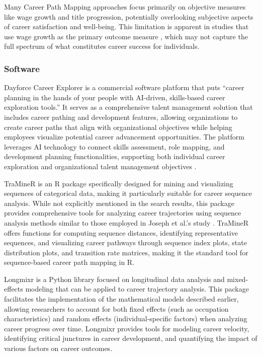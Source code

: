 \documentclass[../main.tex]{subfiles}
\begin{document}
Many Career Path Mapping approaches focus primarily on objective measures like wage growth and title progression, potentially overlooking subjective aspects of career satisfaction and well-being. This limitation is apparent in studies that use wage growth as the primary outcome measure \parencite{workforcegps2023}, which may not capture the full spectrum of what constitutes career success for individuals.

\subsubsection{Software}
Dayforce Career Explorer is a commercial software platform that puts ``career planning in the hands of your people with AI-driven, skills-based career exploration tools.'' It serves as a comprehensive talent management solution that includes career pathing and development features, allowing organizations to create career paths that align with organizational objectives while helping employees visualize potential career advancement opportunities. The platform leverages AI technology to connect skills assessment, role mapping, and development planning functionalities, supporting both individual career exploration and organizational talent management objectives \parencite{dayforce2023}.

TraMineR is an R package specifically designed for mining and visualizing sequences of categorical data, making it particularly suitable for career sequence analysis. While not explicitly mentioned in the search results, this package provides comprehensive tools for analyzing career trajectories using sequence analysis methods similar to those employed in Joseph et al.'s study \parencite{joseph2012}. TraMineR offers functions for computing sequence distances, identifying representative sequences, and visualizing career pathways through sequence index plots, state distribution plots, and transition rate matrices, making it the standard tool for sequence-based career path mapping in R.

Longmixr is a Python library focused on longitudinal data analysis and mixed-effects modeling that can be applied to career trajectory analysis. This package facilitates the implementation of the mathematical models described earlier, allowing researchers to account for both fixed effects (such as occupation characteristics) and random effects (individual-specific factors) when analyzing career progress over time. Longmixr provides tools for modeling career velocity, identifying critical junctures in career development, and quantifying the impact of various factors on career outcomes.
\end{document}
